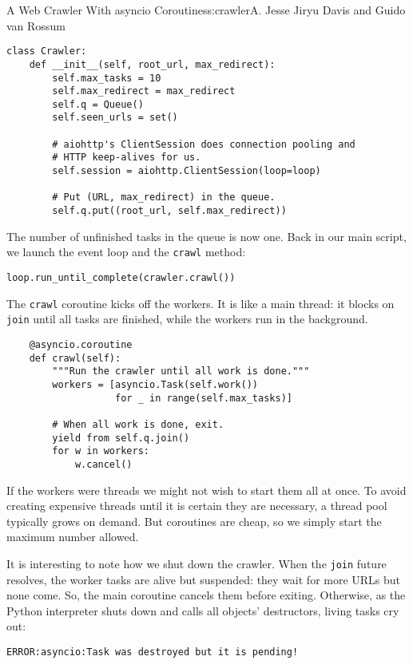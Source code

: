 \begin{aosachapter}{A Web Crawler With asyncio Coroutines}{s:crawler}{A. Jesse Jiryu Davis and Guido van Rossum}
\begin{verbatim}
class Crawler:
    def __init__(self, root_url, max_redirect):
        self.max_tasks = 10
        self.max_redirect = max_redirect
        self.q = Queue()
        self.seen_urls = set()
        
        # aiohttp's ClientSession does connection pooling and
        # HTTP keep-alives for us.
        self.session = aiohttp.ClientSession(loop=loop)
        
        # Put (URL, max_redirect) in the queue.
        self.q.put((root_url, self.max_redirect))
\end{verbatim}

The number of unfinished tasks in the queue is now one. Back in our main
script, we launch the event loop and the \texttt{crawl} method:

\begin{verbatim}
loop.run_until_complete(crawler.crawl())
\end{verbatim}

The \texttt{crawl} coroutine kicks off the workers. It is like a main
thread: it blocks on \texttt{join} until all tasks are finished, while
the workers run in the background.

\begin{verbatim}
    @asyncio.coroutine
    def crawl(self):
        """Run the crawler until all work is done."""
        workers = [asyncio.Task(self.work())
                   for _ in range(self.max_tasks)]

        # When all work is done, exit.
        yield from self.q.join()
        for w in workers:
            w.cancel()
\end{verbatim}

If the workers were threads we might not wish to start them all at once.
To avoid creating expensive threads until it is certain they are
necessary, a thread pool typically grows on demand. But coroutines are
cheap, so we simply start the maximum number allowed.

It is interesting to note how we shut down the crawler. When the
\texttt{join} future resolves, the worker tasks are alive but suspended:
they wait for more URLs but none come. So, the main coroutine cancels
them before exiting. Otherwise, as the Python interpreter shuts down and
calls all objects' destructors, living tasks cry out:

\begin{verbatim}
ERROR:asyncio:Task was destroyed but it is pending!
\end{verbatim}


\end{aosachapter}

